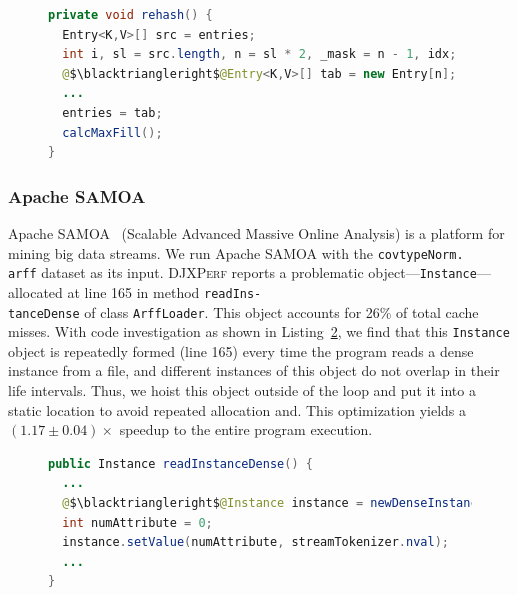 \documentclass[sigconf,10pt,review,anonymous]{acmart}\settopmatter{printfolios=true,printccs=false,printacmref=false}
\newcommand{\tool}[0]{\mbox{\textsc{DJXPerf}}}
\begin{document}
\begin{figure}[h]
\begin{lstlisting}[firstnumber=310,language=java]
private void rehash() {
  Entry<K,V>[] src = entries;
  int i, sl = src.length, n = sl * 2, _mask = n - 1, idx;
  @$\blacktriangleright$@Entry<K,V>[] tab = new Entry[n];
  ...
  entries = tab;
  calcMaxFill();
}
\end{lstlisting}
\vspace{-0.3in}
\label{cache2k}
\end{figure}


\subsubsection{Apache SAMOA}
Apache SAMOA~\cite{SAMOA} (Scalable Advanced Massive Online Analysis) is a platform for mining big data streams. We run Apache SAMOA with the {\tt covtypeNorm.\\arff} dataset as its input. \tool{} reports a problematic object---{\tt Instance}---allocated at line 165 in method {\tt readIns-\\tanceDense} of class {\tt ArffLoader}. This object accounts for 26\% of total cache misses. With code investigation as shown in Listing~\ref{SAMOA}, we find that this {\tt Instance} object is repeatedly formed (line 165) every time the program reads a dense instance from a file, and different instances of this object do not overlap in their life intervals. Thus, we hoist this object outside of the loop and put it into a static location to avoid repeated allocation and. This optimization yields a $(1.17\pm0.04)\times$ speedup to the entire program execution.

\begin{figure}
\begin{lstlisting}[firstnumber=163,language=java]
public Instance readInstanceDense() {
  ...
  @$\blacktriangleright$@Instance instance = newDenseInstance(this.instanceInformation.numAttributes());
  int numAttribute = 0;
  instance.setValue(numAttribute, streamTokenizer.nval);
  ...
}
\end{lstlisting}
\vspace{-0.3in}
\label{SAMOA}
\end{figure}
\end{document}
